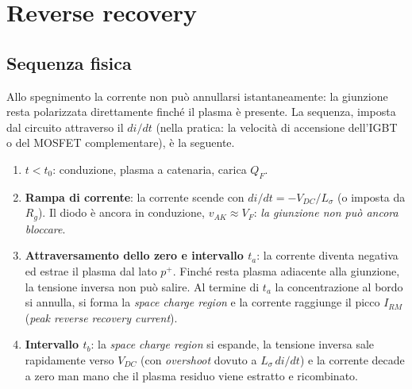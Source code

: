 \section{Reverse recovery}
\label{pindiode:sec:rr}

\subsection{Sequenza fisica}

Allo spegnimento la corrente non può annullarsi istantaneamente: la giunzione
resta polarizzata direttamente finché il plasma è presente. La sequenza,
imposta dal circuito attraverso il $di/dt$ (nella pratica: la velocità di
accensione dell'IGBT o del MOSFET complementare), è la seguente.

\begin{enumerate}
\item \textbf{$t < t_0$}: conduzione, plasma a catenaria, carica $Q_F$.
\item \textbf{Rampa di corrente}: la corrente scende con
$di/dt = -V_{DC}/L_{\sigma}$ (o imposta da $R_g$). Il diodo è ancora
in conduzione, $v_{AK} \approx V_F$: \emph{la giunzione non può ancora bloccare}.
\item \textbf{Attraversamento dello zero e intervallo $t_a$}: la corrente
diventa negativa ed estrae il plasma dal lato $p^{+}$. Finché resta plasma
adiacente alla giunzione, la tensione inversa non può salire. Al termine di
$t_a$ la concentrazione al bordo si annulla, si forma la \emph{space charge
region} e la corrente raggiunge il picco $I_{RM}$ (\emph{peak reverse recovery
current}).
\item \textbf{Intervallo $t_b$}: la \emph{space charge region} si espande, la
tensione inversa sale rapidamente verso $V_{DC}$ (con \emph{overshoot} dovuto a
$L_\sigma\,di/dt$) e la corrente decade a zero man mano che il plasma residuo
viene estratto e ricombinato.
\end{enumerate}

